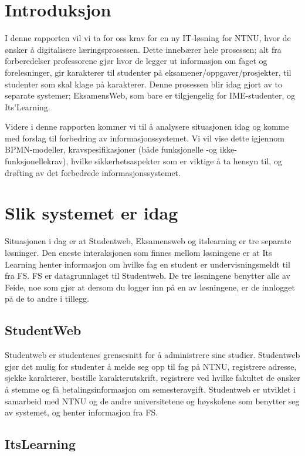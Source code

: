 \documentclass[12pt]{article}
\begin{document}
\newpage
\tableofcontents
\newpage

\section{Introduksjon}

I denne rapporten vil vi ta for oss krav for en ny IT-løsning for NTNU, hvor de ønsker å digitalisere læringsprosessen. Dette innebærer hele prosessen; alt fra forberedelser professorene gjør hvor de legger ut informasjon om faget og forelesninger, gir karakterer til studenter på eksamener/oppgaver/prosjekter, til studenter som skal klage på karakterer. Denne prosessen blir idag gjort av to separate systemer; EksamensWeb, som bare er tilgjengelig for IME-studenter, og Its’Learning. 

Videre i denne rapporten kommer vi til å analysere situasjonen idag og komme med forslag til forbedring av informasjonssystemet. Vi vil vise dette igjennom BPMN-modeller, kravspesifikasjoner (både funksjonelle -og ikke-funksjonellekrav), hvilke sikkerhetsaspekter som er viktige å ta hensyn til, og drøfting av det forbedrede informasjonssystemet. 


\section{Slik systemet er idag}
Situasjonen i dag er at Studentweb, Eksamensweb og itslearning er tre separate løsninger.  Den eneste interaksjonen som finnes mellom løsningene er at Its Learning henter informasjon om hvilke fag en student er undervisningsmeldt til fra FS. FS er datagrunnlaget til Studentweb. De tre løsningene benytter alle av Feide, noe som gjør at dersom du logger inn på en av løsningene, er de innlogget på de to andre i tillegg. 

\subsection{StudentWeb}

Studentweb er studentenes grensesnitt for å administrere sine studier. Studentweb gjør det mulig for studenter å melde seg opp til fag på NTNU, registrere adresse, sjekke karakterer, bestille karakterutskrift, registrere ved hvilke fakultet de ønsker å stemme og få betalingsinformasjon om semesteravgift. Studentweb er utviklet i samarbeid med NTNU og de andre universitetene og høyskolene som benytter seg av systemet, og henter informasjon fra FS. 

\subsection{ItsLearning}
\end{document}
